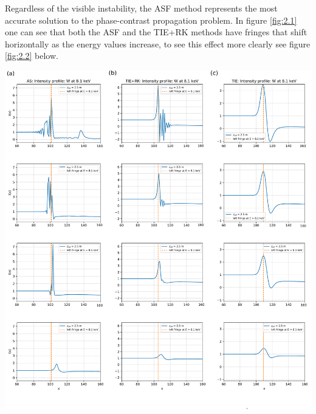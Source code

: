 \documentclass[10pt, a4paper, singlespacing]{report}
\newenvironment{Figure}
    {\par\medskip\noindent\minipage{\linewidth}}
    {\endminipage\par\medskip}
\begin{document}
Regardless of the visible instability, the ASF method represents the most accurate solution to the phase-contrast propagation problem. In figure \ref{fig:2.1} one can see that both the ASF and the TIE+RK methods have fringes that shift horizontally as the energy values increase, to see this effect more clearly see figure \ref{fig:2.2} below.

\begin{Figure} 
 \centering
  \hspace*{-0.9cm}
 \includegraphics[width=\linewidth]{AS_vs_TIE+RK_vs_TIE_2.pdf}

\end{Figure}
\end{document}
